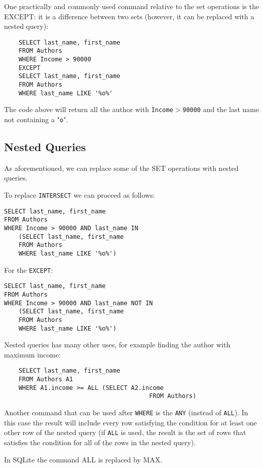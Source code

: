 \documentclass[a4page, 11pt]{article}
\theoremstyle{definition}
\begin{document}
One practically and commonly used command relative to the set operations is the EXCEPT: it is a difference between two sets (however, it can be replaced with a nested query):
\begin{lstlisting}
	SELECT last_name, first_name
	FROM Authors
	WHERE Income > 90000
	EXCEPT 
	SELECT last_name, first_name
	FROM Authors
	WHERE last_name LIKE '%o%' 
\end{lstlisting}
The code above will return all the author with \texttt{Income$>$90000} and the last name not containing a "\texttt{o}".

\subsection{Nested Queries}
As aforementioned, we can replace some of the SET operations with nested queries.

To replace \texttt{INTERSECT} we can proceed as follows:
\begin{lstlisting}
SELECT last_name, first_name
FROM Authors
WHERE Income > 90000 AND last_name IN 
	(SELECT last_name, first_name
	FROM Authors
	WHERE last_name LIKE '%o%')
\end{lstlisting}

For the \texttt{EXCEPT}:
\begin{lstlisting}
SELECT last_name, first_name
FROM Authors
WHERE Income > 90000 AND last_name NOT IN 
	(SELECT last_name, first_name
	FROM Authors
	WHERE last_name LIKE '%o%')
\end{lstlisting}

Nested queries has many other uses, for example finding the author with maximum income:
\begin{lstlisting}
	SELECT last_name, first_name
	FROM Authors A1
	WHERE A1.income >= ALL (SELECT A2.income
										FROM Authors)
\end{lstlisting}

Another command that can be used after \texttt{WHERE} is the \texttt{ANY} (instead of \texttt{ALL}). 
In this case the result will include every row satisfying the condition for at least one other row of the nested query (if \texttt{ALL} is used, the result is the set of rows that satisfies the condition for all of the rows in the nested query). 

In SQLite the command ALL is replaced by MAX.
\end{document}
